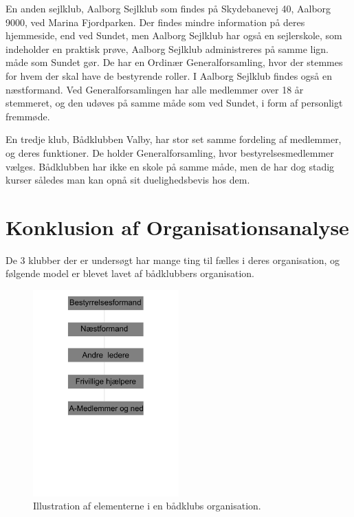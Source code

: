 En anden sejlklub, Aalborg Sejlklub som findes på Skydebanevej 40, Aalborg 9000, ved Marina Fjordparken. Der findes
mindre information på deres hjemmeside, end ved Sundet, men Aalborg Sejlklub har også en sejlerskole, som indeholder en
praktisk prøve,  Aalborg Sejlklub administreres på samme lign. måde som Sundet gør. De har en
Ordinær Generalforsamling, hvor der stemmes for hvem der skal have de bestyrende roller. I Aalborg Sejlklub findes også en næstformand. Ved Generalforsamlingen har alle medlemmer over 18
år stemmeret, og den udøves på samme måde som ved Sundet, i form af personligt fremmøde.\citep{AalborgSejlklub}

En tredje klub, Bådklubben Valby, har stor set samme fordeling af medlemmer, og deres funktioner. De holder Generalforsamling, hvor bestyrelsesmedlemmer vælges. Bådklubben har ikke en skole på samme måde, men de har dog stadig kurser således man kan opnå sit duelighedsbevis hos dem.\citep{BaadklubbenValby}


\section{Konklusion af Organisationsanalyse}

De 3 klubber der er undersøgt har mange ting til fælles i deres organisation, og følgende model er blevet lavet af bådklubbers organisation. 

\begin{figure}[htbp]
  \centering
  \includegraphics[width=0.5\textwidth]{images/organisation/baadOrganisation.pdf}
  \caption[Bådklubs organisation]{Illustration af elementerne i en bådklubs organisation.}
  \label{fig:bådklub-organisation}
\end{figure}

